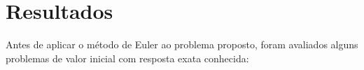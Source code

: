 \documentclass[final,3p]{elsarticle}
\numberwithin{equation}{section}
\begin{document}




\section{Resultados}

        Antes de aplicar o método de Euler ao problema proposto, foram avaliados alguns problemas de valor inicial com resposta exata conhecida:
\end{document}
